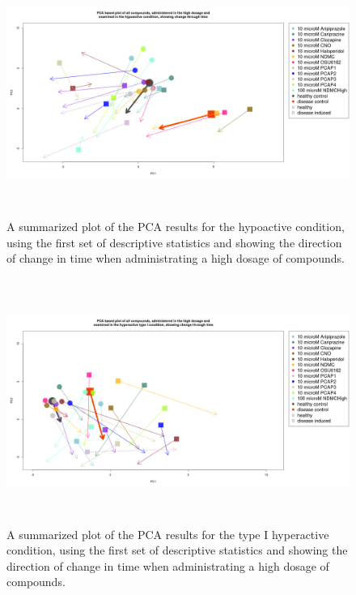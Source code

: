 \documentclass[a4paper,12pt]{article}
\begin{document}
\newpage
\begin{figure}[h!]
\begin{center}
\includegraphics[width=16cm,height=8cm]{All_together_10_microM_DarkApoLow_in_time.png}
\caption{A summarized plot of the PCA results for the hypoactive condition, using the first set of descriptive statistics and showing the direction of change in time when administrating a high dosage of compounds.}
\end{center}
\end{figure}
\newpage
\begin{figure}[h!]
\begin{center}
\includegraphics[width=16cm,height=8cm]{All_together_10_microM_DarkApoHigh_in_time.png}
\caption{A summarized plot of the PCA results for the type I hyperactive condition, using the first set of descriptive statistics and showing the direction of change in time when administrating a high dosage of compounds.}
\end{center}
\end{figure}
\end{document}
